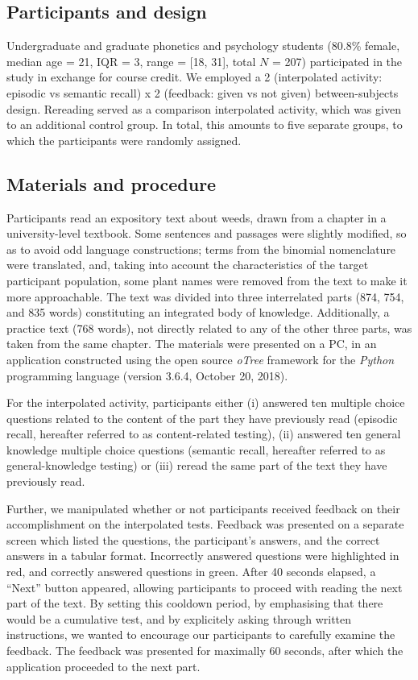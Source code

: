 \documentclass[11pt,]{article}
\title{}
\author{}
\date{}
\begin{document}
\subsection{Participants and design}\label{participants-and-design}

Undergraduate and graduate phonetics and psychology students (80.8\%
female, median age = 21, IQR = 3, range = {[}18, 31{]}, total \(N\) =
207) participated in the study in exchange for course credit. We
employed a 2 (interpolated activity: episodic vs semantic recall) x 2
(feedback: given vs not given) between-subjects design. Rereading served
as a comparison interpolated activity, which was given to an additional
control group. In total, this amounts to five separate groups, to which
the participants were randomly assigned.

\subsection{Materials and procedure}\label{materials-and-procedure}

Participants read an expository text about weeds, drawn from a chapter
in a university-level textbook. Some sentences and passages were
slightly modified, so as to avoid odd language constructions; terms from
the binomial nomenclature were translated, and, taking into account the
characteristics of the target participant population, some plant names
were removed from the text to make it more approachable. The text was
divided into three interrelated parts (874, 754, and 835 words)
constituting an integrated body of knowledge. Additionally, a practice
text (768 words), not directly related to any of the other three parts,
was taken from the same chapter. The materials were presented on a PC,
in an application constructed using the open source \textit{oTree}
framework \citep[version 2.1.35,][]{chenOTreeOpensourcePlatform2016} for
the \textit{Python} programming language (version 3.6.4, October 20,
2018).

For the interpolated activity, participants either (i) answered ten
multiple choice questions related to the content of the part they have
previously read (episodic recall, hereafter referred to as
content-related testing), (ii) answered ten general knowledge multiple
choice questions (semantic recall, hereafter referred to as
general-knowledge testing) or (iii) reread the same part of the text
they have previously read.

Further, we manipulated whether or not participants received feedback on
their accomplishment on the interpolated tests. Feedback was presented
on a separate screen which listed the questions, the participant's
answers, and the correct answers in a tabular format. Incorrectly
answered questions were highlighted in red, and correctly answered
questions in green. After 40 seconds elapsed, a ``Next'' button
appeared, allowing participants to proceed with reading the next part of
the text. By setting this cooldown period, by emphasising that there
would be a cumulative test, and by explicitely asking through written
instructions, we wanted to encourage our participants to carefully
examine the feedback. The feedback was presented for maximally 60
seconds, after which the application proceeded to the next part.
\end{document}
